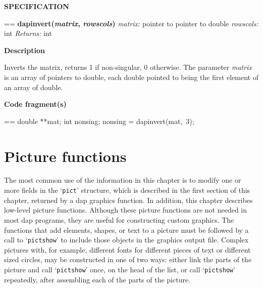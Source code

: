 \documentclass{book}
\makeatletter
\newcommand\Texinfocommandstyletextvar[1]{{\normalfont{}\textsl{#1}}}%
\newenvironment{Texinfopreformatted}{%
  \par\GNUTobeylines\obeyspaces\frenchspacing\parskip=\z@\parindent=\z@}{}
{\catcode`\^^M=13 \gdef\GNUTobeylines{\catcode`\^^M=13 \def^^M{\null\par}}}
\newenvironment{Texinfoindented}{\begin{list}{}{}\item\relax}{\end{list}}
\renewcommand{\_}{\Texinfounderscore\discretionary{}{}{}}
\makeatother
\begin{document}
\noindent{}\textbf{SPECIFICATION}
\begin{Texinfoindented}
\begin{Texinfopreformatted}%
\textbf{dap\_invert(\Texinfocommandstyletextvar{matrix}, \Texinfocommandstyletextvar{rowscols})}
\Texinfocommandstyletextvar{matrix:} pointer to pointer to double
\Texinfocommandstyletextvar{rowscols:} int
\Texinfocommandstyletextvar{Returns:} int
\end{Texinfopreformatted}
\end{Texinfoindented}
%
%

\noindent{}\textbf{Description}

Inverts the matrix, returns 1 if non-singular, 0 otherwise.
The parameter \Texinfocommandstyletextvar{matrix} is an array of pointers to double, each double pointed
to being the first element of an array of double.

\noindent{}\textbf{Code fragment(s)}

\begin{Texinfoindented}
\begin{Texinfopreformatted}%
\ttfamily double **mat;
int nonsing;
nonsing = dap\_invert(mat,\ 3);
\end{Texinfopreformatted}
\end{Texinfoindented}

\chapter{{Picture functions}}
\label{anchor:Picture-functions}%

The most common use of the information in this chapter is to modify one or more
fields in the `\texttt{pict}' structure, which is described in the first section
of this chapter, returned by a dap graphics function.
In addition, this chapter describes low-level picture functions.
Although these picture functions are not needed in most dap programs,
they are useful for constructing custom graphics.
The functions that add elements, shapes, or text to a picture must be followed
by a call to `\texttt{pict\_show}' to include those objects in the graphics output file.
Complex pictures with, for example, different fonts
for different pieces of text or different sized circles, may be constructed
in one of two ways: either link the parts of the picture
and call `\texttt{pict\_show}' once, on the head of the list, or call
`\texttt{pict\_show}' repeatedly, after assembling each of the parts of
the picture.
\end{document}
